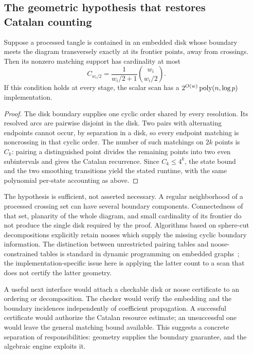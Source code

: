 \subsection{The geometric hypothesis that restores Catalan counting}

\begin{proposition}
\label{prop:disk-frontier}
Suppose a processed tangle is contained in an embedded disk whose boundary
meets the diagram transversely exactly at its frontier points, away from
crossings.  Then its nonzero matching support has cardinality at most
\begin{equation}
 C_{w_i/2}=\frac{1}{w_i/2+1}\binom{w_i}{w_i/2}.
\end{equation}
If this condition holds at every stage, the scalar scan has a
$2^{O(w)}\operatorname{poly}(n,\log p)$ implementation.
\end{proposition}

\begin{proof}
The disk boundary supplies one cyclic order shared by every resolution.  Its
resolved arcs are pairwise disjoint in the disk.  Two pairs with alternating
endpoints cannot occur, by separation in a disk, so every endpoint matching is
noncrossing in that cyclic order.  The number of such matchings on $2k$ points
is $C_k$: pairing a distinguished point divides the remaining points into two
even subintervals and gives the Catalan recurrence.  Since $C_k\leq4^k$, the
state bound and the two smoothing transitions yield the stated runtime, with
the same polynomial per-state accounting as above.
\end{proof}

The hypothesis is sufficient, not asserted necessary.  A regular neighborhood
of a processed crossing set can have several boundary components.  Connectedness
of that set, planarity of the whole diagram, and small cardinality of its
frontier do not produce the single disk required by the proof.  Algorithms
based on sphere-cut decompositions explicitly retain nooses which supply the
missing cyclic boundary information.  The distinction between unrestricted
pairing tables and noose-constrained tables is standard in dynamic programming
on embedded graphs~\cite{ruesauthilikos}; the implementation-specific issue here
is applying the latter count to a scan that does not certify the latter
geometry.

A useful next interface would attach a checkable disk or noose certificate to
an ordering or decomposition.  The checker would verify the embedding and the
boundary incidences independently of coefficient propagation.  A successful
certificate would authorize the Catalan resource estimate; an unsuccessful one
would leave the general matching bound available.  This suggests a concrete
separation of responsibilities: geometry supplies the boundary guarantee, and
the algebraic engine exploits it.

